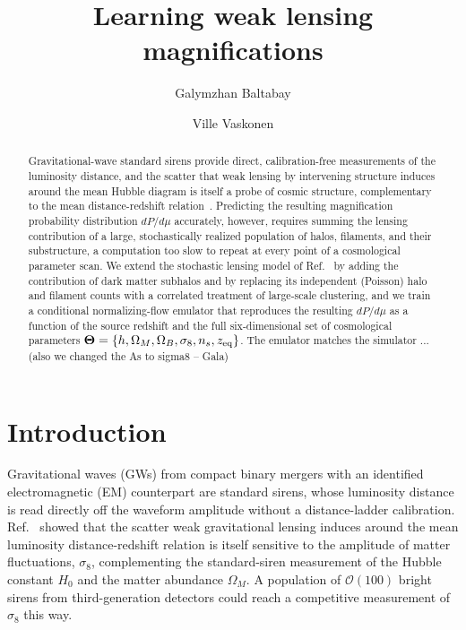 \documentclass[aps,prd,10pt,nofootinbib,twocolumn,superscriptaddress,floatfix,notitlepage]{revtex4-1}
\newcommand{\vect}[1]{\boldsymbol{#1}}
\newcommand{\Gala}[1]{{\color{orange} (#1 -- Gala)}}
\begin{document}
\title{Learning weak lensing magnifications}

\author{Galymzhan Baltabay}

\author{Ville Vaskonen}

\begin{abstract}
Gravitational-wave standard sirens provide direct, calibration-free measurements of the luminosity distance, and the scatter that weak lensing by intervening structure induces around the mean Hubble diagram is itself a probe of cosmic structure, complementary to the mean distance-redshift relation~\cite{Vaskonen:2026ubd}. Predicting the resulting magnification probability distribution $dP/d\mu$ accurately, however, requires summing the lensing contribution of a large, stochastically realized population of halos, filaments, and their substructure, a computation too slow to repeat at every point of a cosmological parameter scan. We extend the stochastic lensing model of Ref.~\cite{Vaskonen:2026ubd} by adding the contribution of dark matter subhalos and by replacing its independent (Poisson) halo and filament counts with a correlated treatment of large-scale clustering, and we train a conditional normalizing-flow emulator that reproduces the resulting $dP/d\mu$ as a function of the source redshift and the full six-dimensional set of cosmological parameters $\vect\Theta = \{h,\Omega_M,\Omega_B,\sigma_8,n_s,z_{\rm eq}\}$. The emulator matches the simulator ... \Gala{also we changed the As to sigma8}
\end{abstract}


\maketitle

\section{Introduction}
Gravitational waves (GWs) from compact binary mergers with an identified electromagnetic (EM) counterpart are standard sirens, whose luminosity distance is read directly off the waveform amplitude without a distance-ladder calibration. Ref.~\cite{Vaskonen:2026ubd} showed that the scatter weak gravitational lensing induces around the mean luminosity distance-redshift relation is itself sensitive to the amplitude of matter fluctuations, $\sigma_8$, complementing the standard-siren measurement of the Hubble constant $H_0$ and the matter abundance $\Omega_M$. A population of $\mathcal{O}(100)$ bright sirens from third-generation detectors could reach a competitive measurement of $\sigma_8$ this way.
\end{document}
